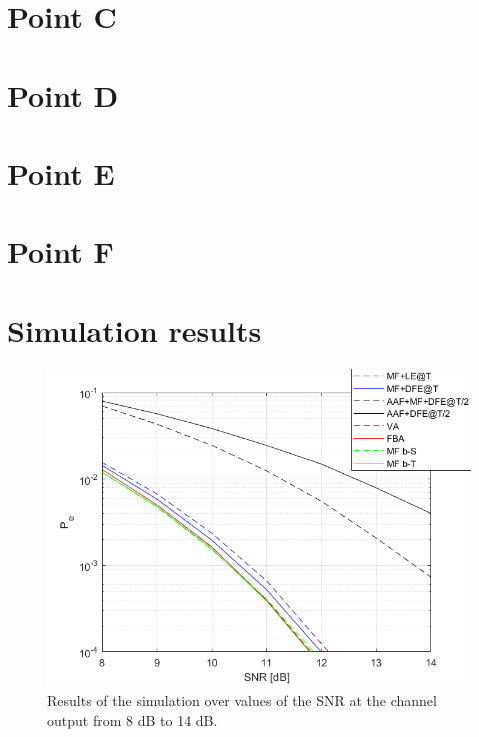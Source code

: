 \documentclass[a4paper,11.5pt]{article}
\begin{document}
\section*{Point C}

\section*{Point D}

\section*{Point E}

\section*{Point F}

\section*{Simulation results}

\begin{figure}[ht]
	\begin{center}   
		\includegraphics[width=\textwidth]{figs/SNR_Pe.png} 
		\caption{Results of the simulation over values of the SNR at the channel output from 8 dB to 14 dB.}
		\label{fig:B_b}
	\end{center}
\end{figure}
\end{document}
